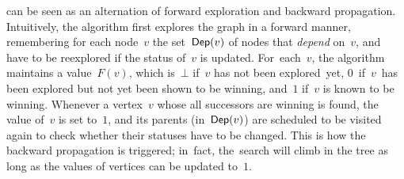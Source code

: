  can be seen as an alternation of forward
exploration and backward propagation. Intuitively, the algorithm first
explores the graph in a forward manner, remembering for each node~$v$
the set~$\textsf{Dep}(v)$ of nodes that \emph{depend} on~$v$, and have to be
reexplored if the status of~$v$ is updated.
For~each~$v$, the algorithm maintains a
value~$F(v)$, which is~$\bot$ if~$v$ has not been explored~yet,
$0$~if~$v$~has been explored but not yet been shown to be winning, %
and~$1$ if~$v$ is known to be winning. %
Whenever a vertex~$v$ whose all successors are winning is found, the value of~$v$ is set to~$1$, and its parents (in~$\textsf{Dep}(v)$)
are scheduled to be visited again to check whether their statuses have to be changed.
This is how the backward propagation is triggered; in~fact, the~search will climb in the tree as long as the values of
vertices can be updated to~$1$.





